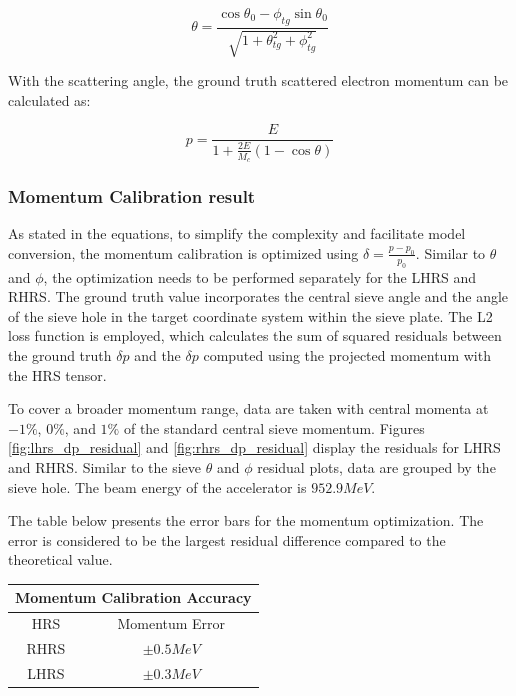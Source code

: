 \begin{equation} \label{eq:chapter4_scattered_angle_from_central_angle}
\theta = \frac{\cos{\theta_0} - \phi_{tg}\sin{\theta_0}}{\sqrt{1 + \theta^2_{tg} + \phi^2_{tg}}}
\end{equation}

With the scattering angle, the ground truth scattered electron momentum can be calculated as:

\begin{equation}
 p = \frac{E}{1 + \frac{2E}{M_c}(1 - \cos{\theta})}
\end{equation}


\subsubsection{Momentum Calibration result}
As stated in the equations, to simplify the complexity and facilitate model conversion, the momentum calibration is optimized using $\delta = \frac{p - p_0}{p_0}$. Similar to $\theta$ and $\phi$, the optimization needs to be performed separately for the LHRS and RHRS. The ground truth value incorporates the central sieve angle and the angle of the sieve hole in the target coordinate system within the sieve plate. The L2 loss function is employed, which calculates the sum of squared residuals between the ground truth $\delta p$ and the $\delta p$ computed using the projected momentum with the HRS tensor.

To cover a broader momentum range, data are taken with central momenta at $-1\%$, $0\%$, and $1\%$ of the standard central sieve momentum. Figures \ref{fig:lhrs_dp_residual} and \ref{fig:rhrs_dp_residual} display the residuals for LHRS and RHRS. Similar to the sieve $\theta$ and $\phi$ residual plots, data are grouped by the sieve hole. The beam energy of the accelerator is $952.9 MeV$.

The table below presents the error bars for the momentum optimization. The error is considered to be the largest residual difference compared to the theoretical value.

\begin{center}
    \begin{tabular}{|c || c |}
        \hline
        \multicolumn{2}{|c|}{Momentum Calibration Accuracy} \\
        \hline
            HRS & Momentum Error \\
        \hline
            RHRS & $\pm 0.5MeV$ \\
        \hline
            LHRS & $\pm 0.3MeV$ \\
        \hline
    \end{tabular}
\end{center}


